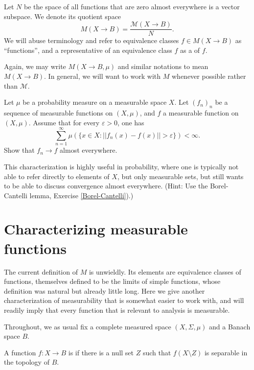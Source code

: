 \begin{definition}
Let $N$ be the space of all functions that are zero almost everywhere is a vector subspace. We denote its quotient space
\[M(X \to B) = \frac{\mathcal M(X \to B)}{N}.\]
We will abuse terminology and refer to equivalence classes $f \in M(X \to B)$ as ``functions'', and a representative of an equivalence class $f$ as a  of $f$.
\end{definition}

\begin{subsec}
Again, we may write $M(X \to B, \mu)$ and similar notations to mean $M(X \to B)$.
In general, we will want to work with $M$ whenever possible rather than $\mathcal M$.
\end{subsec}

\begin{exercise}
Let $\mu$ be a probability measure on a measurable space $X$.
Let $(f_{n})_{n}$ be a sequence of measurable functions on $(X, \mu)$, and $f$ a measurable function on $(X, \mu)$.
Assume that for every $\varepsilon > 0$, one has
\[\sum_{n=1}^{\infty} \mu(\{x \in X: ||f_{n}(x) - f(x)|| > \varepsilon\}) < \infty.\]
Show that $f_{n} \to f$ almost everywhere.

This characterization is highly useful in probability, where one is typically not able to refer directly to elements of $X$, but only measurable sets, but still wants to be able to discuss convergence almost everywhere.
(Hint: Use the Borel-Cantelli lemma, Exercise \ref{Borel-Cantelli}).)
\end{exercise}



\section{Characterizing measurable functions}
The current definition of $M$ is unwieldly. Its elements are equivalence classes of functions, themselves defined to be the limits of simple functions, whose definition was natural but already little long.
Here we give another characterization of measurability that is somewhat easier to work with, and will readily imply that every function that is relevant to analysis is measurable.

\begin{subsec}
Throughout, we as usual fix a complete measured space $(X, \Sigma, \mu)$ and a Banach space $B$.
\end{subsec}

\begin{definition}
\label{almost separably valued dfn}
A function $f: X \to B$ is  if there is a null set $Z$ such that $f(X \setminus Z)$ is separable in the topology of $B$.
\end{definition}

